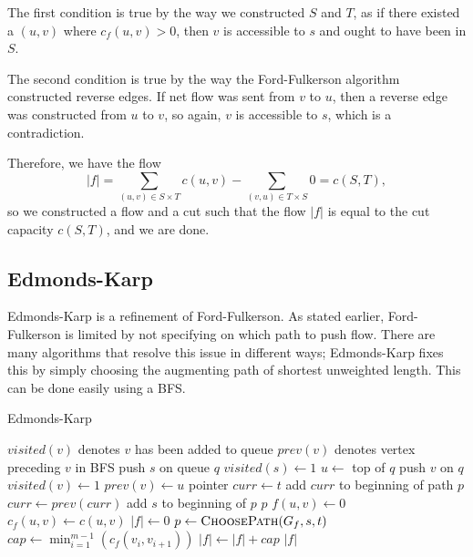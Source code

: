 The first condition is true by the way we constructed $S$ and $T$, as if there existed a $(u,v)$ where $c_f(u,v) > 0$, then $v$ is accessible to $s$ and ought to have been in $S$.

The second condition is true by the way the Ford-Fulkerson algorithm constructed reverse edges. If net flow was sent from $v$ to $u$, then a reverse edge was constructed from $u$ to $v$, so again, $v$ is accessible to $s$, which is a contradiction.

Therefore, we have the flow
\[|f|=\sum_{(u,v) \in S \times T} c(u,v) - \sum_{(v,u) \in T \times S} 0 = c(S,T),\]
so we constructed a flow and a cut such that the flow $|f|$ is equal to the cut capacity $c(S,T)$, and we are done.

\subsection{Edmonds-Karp}

Edmonds-Karp is a refinement of Ford-Fulkerson. As stated earlier, Ford-Fulkerson is limited by not specifying on which path to push flow. There are many algorithms that resolve this issue in different ways; Edmonds-Karp fixes this by simply choosing the augmenting path of shortest unweighted length. This can be done easily using a BFS.

\begin{algorithm}[H]
\caption{Edmonds-Karp}
\begin{algorithmic}
	\State $visited(v)$ denotes $v$ has been added to queue
	\State $prev(v)$ denotes vertex preceding $v$ in BFS
	\State push $s$ on queue $q$
	\State $visited(s) \gets 1$
		\State $u \gets $ top of $q$
			\State push $v$ on $q$
			\State $visited(v) \gets 1$
			\State $prev(v) \gets u$
		\EndFor
	\EndWhile
	\State pointer $curr \gets t$
		\State add $curr$ to beginning of path $p$
		\State $curr \gets prev(curr)$
	\EndWhile
	\State add $s$ to beginning of $p$
	\State \Return $p$
\EndFunction
{}
		\State $f(u,v) \gets 0$
		\State $c_f(u,v) \gets c(u,v)$
	\EndFor
	\State $|f| \gets 0$
		\State $p \gets \Call{ChoosePath}{G_f,s,t}$
		\State $cap \gets \min_{i=1}^{m-1}(c_f(v_i,v_{i+1}))$
		\State $|f| \gets |f| + cap$
		\State {}
	\EndWhile
	\Return $|f|$
\EndFunction
\end{algorithmic}
\end{algorithm}

